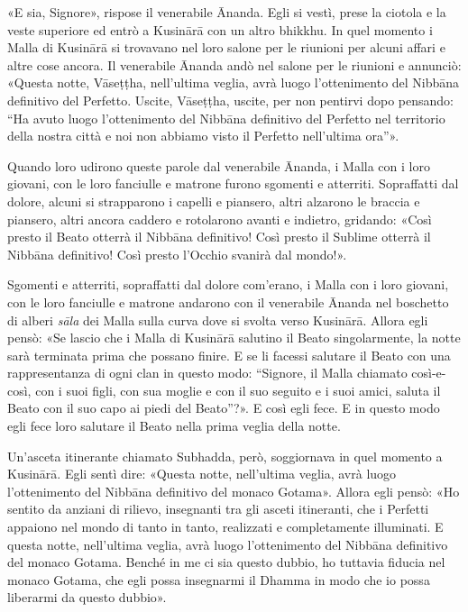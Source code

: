 «E sia, Signore», rispose il venerabile Ānanda. Egli si vestì, prese la
ciotola e la veste superiore ed entrò a Kusinārā con un altro bhikkhu.
In quel momento i Malla di Kusinārā si trovavano nel loro salone per le
riunioni per alcuni affari e altre cose ancora. Il venerabile Ānanda
andò nel salone per le riunioni e annunciò: «Questa notte, Vāseṭṭha,
nell’ultima veglia, avrà luogo l’ottenimento del Nibbāna definitivo del
Perfetto. Uscite, Vāseṭṭha, uscite, per non pentirvi dopo pensando: “Ha
avuto luogo l’ottenimento del Nibbāna definitivo del Perfetto nel
territorio della nostra città e noi non abbiamo visto il Perfetto
nell’ultima ora”».


Quando loro udirono queste parole dal venerabile Ānanda, i Malla con i
loro giovani, con le loro fanciulle e matrone furono sgomenti e
atterriti. Sopraffatti dal dolore, alcuni si strapparono i capelli e
piansero, altri alzarono le braccia e piansero, altri ancora caddero e
rotolarono avanti e indietro, gridando: «Così presto il Beato otterrà il
Nibbāna definitivo! Così presto il Sublime otterrà il Nibbāna
definitivo! Così presto l’Occhio svanirà dal mondo!».


Sgomenti e atterriti, sopraffatti dal dolore com’erano, i Malla con i
loro giovani, con le loro fanciulle e matrone andarono con il venerabile
Ānanda nel boschetto di alberi \emph{sāla} dei Malla sulla curva dove si
svolta verso Kusinārā. Allora egli pensò: «Se lascio che i Malla di
Kusinārā salutino il Beato singolarmente, la notte sarà terminata prima
che possano finire. E se li facessi salutare il Beato con una
rappresentanza di ogni clan in questo modo: “Signore, il Malla chiamato
così-e-così, con i suoi figli, con sua moglie e con il suo seguito e i
suoi amici, saluta il Beato con il suo capo ai piedi del Beato”?». E
così egli fece. E in questo modo egli fece loro salutare il Beato nella
prima veglia della notte.


Un’asceta itinerante chiamato Subhadda, però, soggiornava in quel
momento a Kusinārā. Egli sentì dire: «Questa notte, nell’ultima veglia,
avrà luogo l’ottenimento del Nibbāna definitivo del monaco Gotama».
Allora egli pensò: «Ho sentito da anziani di rilievo, insegnanti tra gli
asceti itineranti, che i Perfetti appaiono nel mondo di tanto in tanto,
realizzati e completamente illuminati. E questa notte, nell’ultima
veglia, avrà luogo l’ottenimento del Nibbāna definitivo del monaco
Gotama. Benché in me ci sia questo dubbio, ho tuttavia fiducia nel
monaco Gotama, che egli possa insegnarmi il Dhamma in modo che io possa
liberarmi da questo dubbio».


